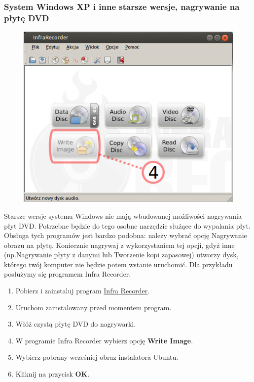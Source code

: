 \subsubsection{System Windows XP i inne starsze wersje, nagrywanie na płytę DVD}
\begin{figure}
		\includegraphics[width=\linewidth]{images/instalacja_nagrywanie_obrazu_DVD_winXP.png}
\end{figure}
Starsze wersje systemu Windows nie mają wbudowanej możliwości nagrywania płyt DVD. Potrzebne będzie do tego osobne narzędzie służące do wypalania płyt. Obsługa tych programów jest bardzo podobna: należy wybrać opcję Nagrywanie obrazu na płytę. Koniecznie nagrywaj z wykorzystaniem tej opcji, gdyż inne (np.Nagrywanie płyty z danymi lub Tworzenie kopi zapasowej) utworzy dysk, którego twój komputer nie będzie potem wstanie uruchomić. Dla przykładu posłużymy się programem Infra Recorder.

\begin{enumerate}
\item Pobierz i zainstaluj program \href{http://infrarecorder.org/?page_id=5}{Infra Recorder}.
\item Uruchom zainstalowany przed momentem program.
\item Włóż czystą płytę DVD do nagrywarki.
\item W programie Infra Recorder wybierz opcję \textbf{Write Image}.
\item Wybierz pobrany wcześniej obraz instalatora Ubuntu.
\item Kliknij na przycisk \textbf{OK}.
\end{enumerate}
\clearpage










